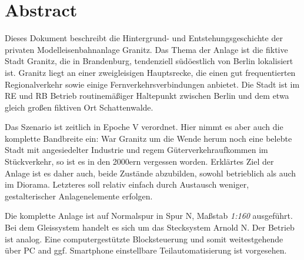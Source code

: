 \section*{Abstract}
\label{sec:abstract}

Dieses Dokument beschreibt die Hintergrund- und Entstehungsgeschichte der privaten Modelleisenbahnanlage Granitz.
Das Thema der Anlage ist die fiktive Stadt Granitz, die in Brandenburg, tendenziell s\"ud\"oestlich von Berlin lokalisiert ist.
Granitz liegt an einer zweigleisigen Hauptsrecke, die einen gut frequentierten Regionalverkehr sowie einige Fernverkehrsverbindungen anbietet.
Die Stadt ist im RE und RB Betrieb routinem\"a{\ss}iger Haltepunkt zwischen Berlin und dem etwa gleich gro{\ss}en fiktiven Ort Schattenwalde.

Das Szenario ist zeitlich in Epoche V verordnet.
Hier nimmt es aber auch die komplette Bandbreite ein:
War Granitz um die Wende herum noch eine belebte Stadt mit angesiedelter Industrie und regem G\"uterverkehraufkommen im St\"uckverkehr, so ist es in den 2000ern vergessen worden.
Erkl\"artes Ziel der Anlage ist es daher auch, beide Zust\"ande abzubilden, sowohl betrieblich als auch im Diorama.
Letzteres soll relativ einfach durch Austausch weniger, gestalterischer Anlagenelemente erfolgen.

Die komplette Anlage ist auf Normalspur in Spur N, Ma{\ss}stab \textit{1:160} ausgef\"uhrt.
Bei dem Gleissystem handelt es sich um das Stecksystem Arnold N.
Der Betrieb ist analog.
Eine computergest\"utzte Blocksteuerung und somit weitestgehende \"uber PC and ggf. Smartphone einstellbare Teilautomatisierung ist vorgesehen.